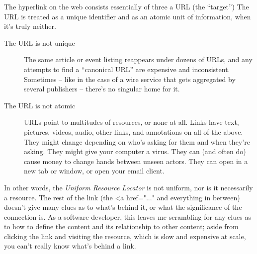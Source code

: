 
The hyperlink on the web consists essentially of three a URL (the ``target'') The URL is treated as a unique identifier and as an atomic unit of information, when it's truly neither.

\begin{description}
\item[The URL is not unique] The same article or event listing reappears under dozens of URLs, and any attempts to find a ``canonical URL'' are expensive and inconsistent. Sometimes -- like in the case of a wire service that gets aggregated by several publishers -- there's no singular home for it.

\item[The URL is not atomic] URLs point to multitudes of resources, or none at all. Links have text, pictures, videos, audio, other links, and annotations on all of the above. They might change depending on who's asking for them and when they're asking. They might give your computer a virus. They can (and often do) cause money to change hands between unseen actors. They can open in a new tab or window, or open your email client.
\end{description}

In other words, the \emph{Uniform Resource Locator} is not uniform, nor is it necessarily a resource. The rest of the link (the <a href="..."\> and everything in between) doesn't give many clues as to what's behind it, or what the significance of the connection is. As a software developer, this leaves me scrambling for any clues as to how to define the content and its relationship to other content; aside from clicking the link and visiting the resource, which is slow and expensive at scale, you can't really know what's behind a link. 


